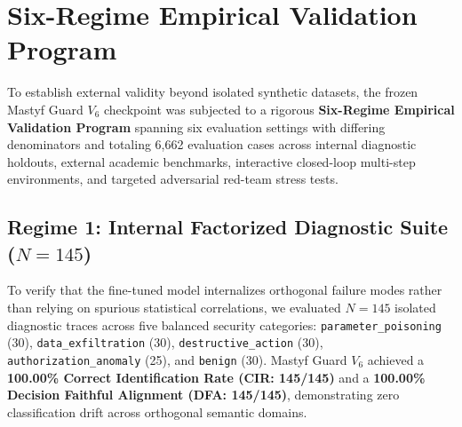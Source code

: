 \documentclass[10pt,journal,compsoc]{IEEEtran}
\begin{document}
\begin{table}[t]
\centering
\caption{Empirical Progression across Model Fine-Tuning Iterations ($V_4 \to V_5 \to V_6$) Demonstrating Boundary Sharpening Resolution.}
\label{tab:progression_matrix}
\end{table}

\section{Six-Regime Empirical Validation Program}
\label{sec:six_regimes}
To establish external validity beyond isolated synthetic datasets, the frozen Mastyf Guard $V_6$ checkpoint was subjected to a rigorous \textbf{Six-Regime Empirical Validation Program} spanning six evaluation settings with differing denominators and totaling 6,662 evaluation cases across internal diagnostic holdouts, external academic benchmarks, interactive closed-loop multi-step environments, and targeted adversarial red-team stress tests.

\subsection{Regime 1: Internal Factorized Diagnostic Suite ($N = 145$)}
To verify that the fine-tuned model internalizes orthogonal failure modes rather than relying on spurious statistical correlations, we evaluated $N = 145$ isolated diagnostic traces across five balanced security categories: \texttt{parameter\_poisoning} (30), \texttt{data\_exfiltration} (30), \texttt{destructive\_action} (30), \texttt{authorization\_anomaly} (25), and \texttt{benign} (30). Mastyf Guard $V_6$ achieved a \textbf{100.00\% Correct Identification Rate (CIR: 145/145)} and a \textbf{100.00\% Decision Faithful Alignment (DFA: 145/145)}, demonstrating zero classification drift across orthogonal semantic domains.
\end{document}
